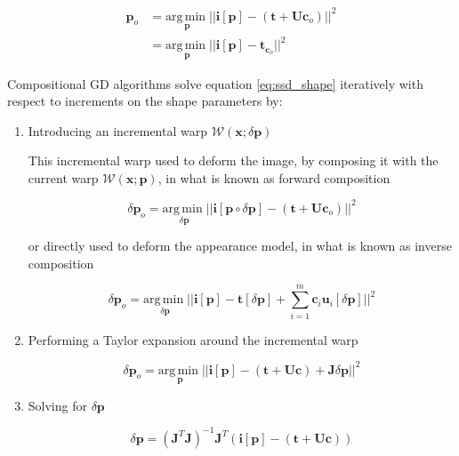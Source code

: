 \begin{align}
\mathbf{p}_o & = \underset{\mathbf{p}}{\mathrm{arg\,min\;}} 
|| \mathbf{i}[\mathbf{p}] - \left( \mathbf{t} + \mathbf{U} \mathbf{c}_o \right) ||^2 
\\
& = \underset{\mathbf{p}}{\mathrm{arg\,min\;}} 
|| \mathbf{i}[\mathbf{p}] - \mathbf{t}_{\mathbf{c}_o} ||^2 
\label{eq:ssd_shape}
\end{align}

Compositional GD algorithms solve equation \ref{eq:ssd_shape} iteratively with respect to increments on the shape parameters by:

\begin{enumerate}

\item Introducing an incremental warp $\mathcal{W}(\mathbf{x}; \delta \mathbf{p})$

This incremental warp used to deform the image, by composing it with the current warp $\mathcal{W}(\mathbf{x}; \mathbf{p})$, in what is known as forward composition

\begin{equation}
\delta \mathbf{p}_o = \underset{\delta \mathbf{p}}{\mathrm{arg\,min\;}} 
|| \mathbf{i} [\mathbf{p} \circ \delta \mathbf{p}] - \left( \mathbf{t} + \mathbf{U} \mathbf{c}_o \right) ||^2 
\end{equation}

or directly used to deform the appearance model, in what is known as inverse composition

\begin{equation}
\delta \mathbf{p}_o = \underset{\delta \mathbf{p}}{\mathrm{arg\,min\;}} 
|| \mathbf{i} [\mathbf{p}] - \mathbf{t}[\delta \mathbf{p}] + \sum_{i=1}^m \mathbf{c}_i \mathbf{u}_i[\delta \mathbf{p}] ||^2 
\end{equation}

\item Performing a Taylor expansion around the incremental warp

\begin{equation}
\delta \mathbf{p}_o = \underset{\mathbf{p}}{\mathrm{arg\,min\;}} 
|| \mathbf{i} [\mathbf{p}] - (\mathbf{t} + \mathbf{U} \mathbf{c}) + \mathbf{J} \delta \mathbf{p} ||^2
\label{eq:sim_linear}
\end{equation}

\item Solving for $\delta \mathbf{p}$

\begin{equation}
\delta \mathbf{p} = 
\left( \mathbf{J}^T \mathbf{J} \right)^{-1} \mathbf{J}^T \left( \mathbf{i}[\mathbf{p}] - (\mathbf{t} + \mathbf{U} \mathbf{c}) \right)
\end{equation}


\end{enumerate}
